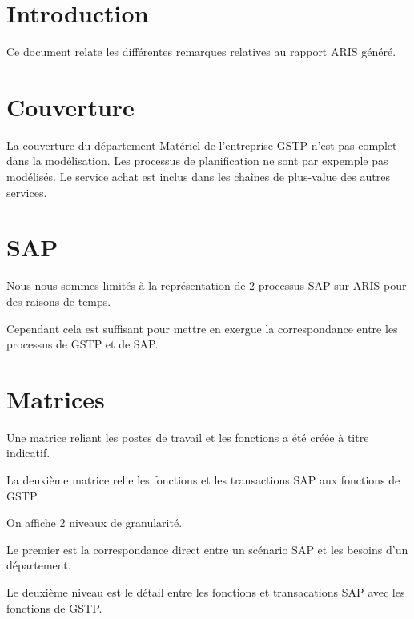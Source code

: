 \documentclass[a4paper]{article}
\begin{document}
\maketitle

\section{Introduction}

Ce document relate les différentes remarques relatives au rapport ARIS généré. 

\section{Couverture}

La couverture du département Matériel de l'entreprise GSTP n'est pas complet 
dans la modélisation. Les processus de planification ne sont par expemple pas 
modélisés. Le service achat est inclus dans les chaînes de plus-value des autres 
services.

\section{SAP}

Nous nous sommes limités à la représentation de 2 processus SAP sur ARIS pour 
des raisons de temps.

Cependant cela est suffisant pour mettre en exergue la correspondance entre les 
processus de GSTP et de SAP.

\section{Matrices}

Une matrice reliant les postes de travail et les fonctions a été créée à titre 
indicatif.

La deuxième matrice relie les fonctions et les transactions SAP aux fonctions 
de GSTP.

On affiche 2 niveaux de granularité.

Le premier est la correspondance direct entre un scénario SAP et les besoins 
d'un département. 

Le deuxième niveau est le détail entre les fonctions et transacations SAP avec 
les fonctions de GSTP.
\end{document}

